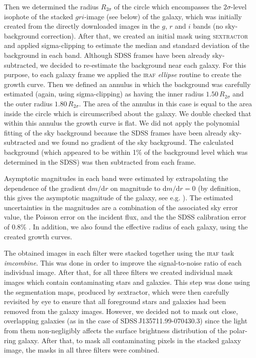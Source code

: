 \documentclass[a4paper,fleqn,usenatbib]{mnras}
\begin{document}
Then we determined the radius $R_{2\sigma}$ of the circle which encompasses 
the $2\sigma$-level isophote of the stacked $gri$-image (see below) of the galaxy, 
which was initially created from the directly downloaded images in the $g$, $r$ and $i$ bands (no sky-background correction). 
After that, we created an initial mask using \textsc{sextractor} 
\citep{1996A&AS..117..393B} and applied  sigma-clipping to estimate the median 
and standard deviation of the background in each band. Although SDSS frames have 
been already sky-subtracted, we decided to re-estimate the background near each 
galaxy. For this purpose, to each galaxy frame we applied the \textsc{iraf} 
\textit{ellipse} routine to create the growth curve. Then we defined an annulus 
in which the background was carefully estimated (again, using sigma-clipping) 
as having the inner radius $1.50\,R_{2\sigma}$ and the outer radius 
$1.80\,R_{2\sigma}$. The area of the annulus in this case is equal to the area 
inside the circle which is circumscribed about the galaxy. We double checked 
that within this annulus the growth curve is flat. We did not apply the polynomial 
fitting of the sky background because the SDSS frames have been already 
sky-subtracted and we found no gradient of the sky background. The calculated 
background (which appeared to be within 1\% of the background level which was 
determined in the SDSS) was then subtracted from each frame.

Asymptotic magnitudes in each band were estimated by extrapolating the 
dependence of the gradient $\mathrm{d}m/\mathrm{d}r$ on magnitude to 
$\mathrm{d}m/\mathrm{d}r=0$ (by definition, this gives the asymptotic magnitude 
of the galaxy, see e.g. \citealt{2015ApJS..219....3M}). The estimated 
uncertainties in the magnitudes are a combination of the associated sky error 
value, the Poisson error on the incident flux, and the the SDSS calibration 
error of 0.8\% \citep{2015ApJS..219...12A}. In addition, we also found the 
effective radius of each galaxy, using the created growth curves.

The obtained images in each filter were stacked together using the \textsc{iraf} 
task \textit{imcombine}. 
This was done in order to improve the signal-to-noise ratio of each individual 
image. After that, for all three filters we created individual mask images
which contain contaminating stars and galaxies. This step was done using 
the segmentation maps, produced by {\sc sextractor}, which 
were then carefully revisited by eye to ensure that all foreground stars 
and galaxies had been removed from the galaxy images. However, we decided 
not to mask out close, overlapping galaxies (as in the case of 
SDSS\,J135711.99-070430.3) since the light from them non-negligibly affects 
the surface brightness distribution of the polar-ring galaxy. 
After that, to mask all contaminating pixels in the stacked galaxy image, 
the masks in all three filters were combined. 
\end{document}
